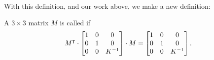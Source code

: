 \documentclass[newpage,hints,handout]{ximera}
\begin{document}
With this definition, and our work above, we make a new definition:


\begin{definition}
A $3\times3$ matrix $M$ is called  if
\[
M^\transpose\cdot\begin{bmatrix}
1 & 0 & 0\\
0 & 1 & 0\\
0 & 0 & K^{-1}%
\end{bmatrix} \cdot M=\begin{bmatrix}
1 & 0 & 0\\
0 & 1 & 0\\
0 & 0 & K^{-1}%
\end{bmatrix}.
\]
\end{definition}
\end{document}
